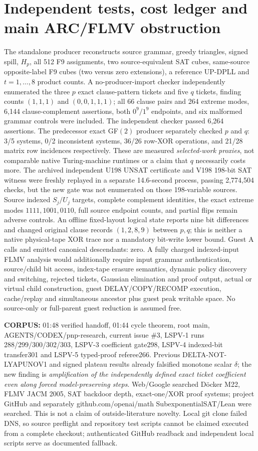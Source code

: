 \documentclass[11pt]{article}
\begin{document}
\section{Independent tests, cost ledger and main ARC/FLMV obstruction}
The standalone producer reconstructs source grammar, greedy triangles, signed spill, $H_p$, all 512 F9 assignments, two source-equivalent SAT cubes, same-source opposite-label F9 cubes (two versus zero extensions), a reference UP-DPLL and $t=1,\ldots,8$ product counts. A no-producer-import checker independently enumerated the three $p$ exact clause-pattern tickets and five $q$ tickets, finding counts $(1,1,1)$ and $(0,0,1,1,1)$; all 66 clause pairs and 264 extreme modes, 6,144 clause-complement assertions, both $0^9/1^9$ endpoints, and six malformed grammar controls were included. The independent checker passed 6,264 assertions. The predecessor exact GF$(2)$ producer separately checked $p$ and $q$: 3/5 systems, 0/2 inconsistent systems, 36/26 row-XOR operations, and 21/28 matrix row incidences respectively. These are measured \emph{selected-work proxies}, not comparable native Turing-machine runtimes or a claim that $q$ necessarily costs more.
The archived independent U198 UNSAT certificate and V198 198-bit SAT witness were freshly replayed in a separate 14.6-second process, passing 2,774,504 checks, but the new gate was not enumerated on those 198-variable sources. Source indexed $S_j/U_j$ targets, complete complement identities, the exact extreme modes $1111,1001,0110$, full source endpoint counts, and partial flips remain adverse controls. An offline fixed-layout logical state reports nine bit differences and changed original clause records $(1,2,8,9)$ between $p,q$; this is neither a native physical-tape XOR trace nor a mandatory bit-write lower bound. Guest A calls and emitted canonical descendants: zero.
A fully charged indexed-input FLMV analysis would additionally require input grammar authentication, source/child bit access, index-tape erasure semantics, dynamic policy discovery and switching, rejected tickets, Gaussian elimination and proof output, actual or virtual child construction, guest DELAY/COPY/RECOMP execution, cache/replay and simultaneous ancestor plus guest peak writable space. No source-only or full-parent guest reduction is assumed free.
\par\noindent\textbf{CORPUS:} 01:48 verified handoff, 01:44 cycle theorem, root main, AGENTS/CODEX/pnp-research, current issue \#3, LSPV-1 runs 288/299/300/302/303, LSPV-3 coefficient gate298, LSPV-4 indexed-bit transfer301 and LSPV-5 typed-proof referee266. Previous DELTA-NOT-LYAPUNOV1 and signed plateau results already falsified monotone scalar $\delta$; the new finding is \emph{amplification of the independently defined exact ticket coefficient even along forced model-preserving steps}. Web/Google searched D\"ocker M22, FLMV JACM 2005, SAT backdoor depth, exact-one/XOR proof systems; project GitHub and separately github.com/openai/math SubexponentialSAT/Lean were searched. This is not a claim of outside-literature novelty. Local git clone failed DNS, so source preflight and repository test scripts cannot be claimed executed from a complete checkout; authenticated GitHub readback and independent local scripts serve as documented fallback.
\end{document}
